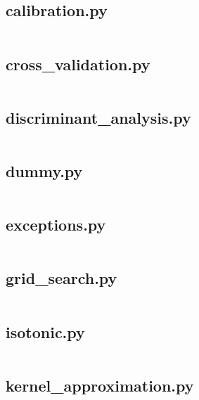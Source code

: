 \documentclass{article}
\begin{document}
\subsection{calibration.py}
\inputminted{python}{/home/dufferzafar/dev/@clones/scikit-learn/sklearn/calibration.py}
\newpage

\subsection{cross\_validation.py}
\inputminted{python}{/home/dufferzafar/dev/@clones/scikit-learn/sklearn/cross_validation.py}
\newpage

\subsection{discriminant\_analysis.py}
\inputminted{python}{/home/dufferzafar/dev/@clones/scikit-learn/sklearn/discriminant_analysis.py}
\newpage

\subsection{dummy.py}
\inputminted{python}{/home/dufferzafar/dev/@clones/scikit-learn/sklearn/dummy.py}
\newpage

\subsection{exceptions.py}
\inputminted{python}{/home/dufferzafar/dev/@clones/scikit-learn/sklearn/exceptions.py}
\newpage

\subsection{grid\_search.py}
\inputminted{python}{/home/dufferzafar/dev/@clones/scikit-learn/sklearn/grid_search.py}
\newpage

\subsection{isotonic.py}
\inputminted{python}{/home/dufferzafar/dev/@clones/scikit-learn/sklearn/isotonic.py}
\newpage

\subsection{kernel\_approximation.py}
\inputminted{python}{/home/dufferzafar/dev/@clones/scikit-learn/sklearn/kernel_approximation.py}
\newpage
\end{document}
